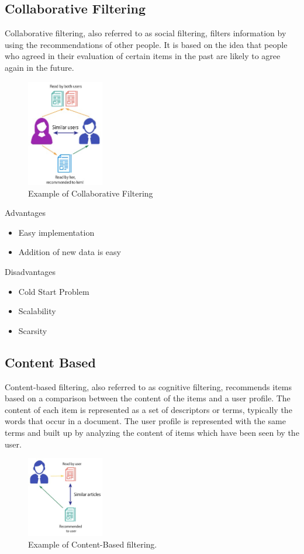 \documentclass[conference]{IEEEtran}
\begin{document}
\subsection{Collaborative Filtering}
	Collaborative filtering, also referred to as social filtering, filters information by using the recommendations of other people. It is based on the idea that people who agreed in their evaluation of certain items in the past are likely to agree again in the future.
	\begin{figure}[h]
  \caption{Example of Collaborative Filtering}
  \centering
    \includegraphics[width=0.3\textwidth]{collab}
\end{figure}

	Advantages	
	\begin{itemize}
	\item Easy implementation
	\item Addition of new data is easy
	\end{itemize}
	Disadvantages	
	\begin{itemize}
	\item Cold Start Problem 
	\item Scalability
	\item Scarsity
	\end{itemize}
	
\subsection{Content Based}
	Content-based filtering, also referred to as cognitive filtering, recommends items based on a comparison between the content of the items and a user profile. The content of each item is represented as a set of descriptors or terms, typically the words that occur in a document. The user profile is represented with the same terms and built up by analyzing the content of items which have been seen by the user.\\
	\begin{figure}[h]
  \caption{Example of Content-Based filtering.}
  \centering
    \includegraphics[width=0.3\textwidth]{content}
\end{figure}
\end{document}
